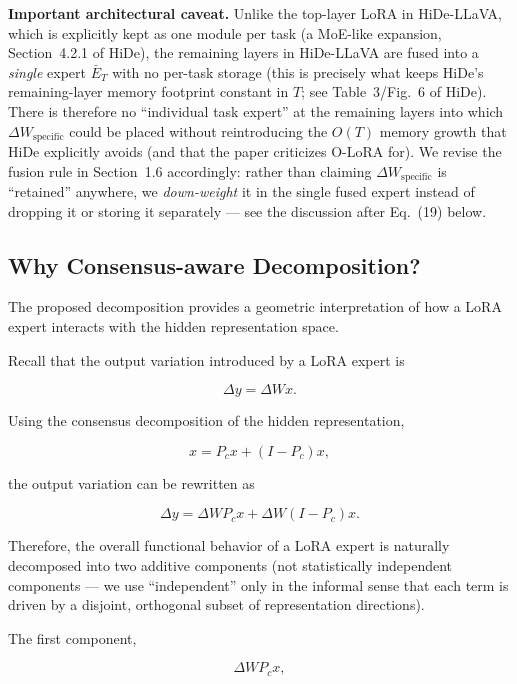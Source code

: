 \documentclass[a4paper]{article}
\begin{document}
\textbf{Important architectural caveat.} Unlike the top-layer LoRA in HiDe-LLaVA, which is explicitly kept as one module per task (a MoE-like expansion, Section~4.2.1 of HiDe), the remaining layers in HiDe-LLaVA are fused into a \emph{single} expert $\bar E_T$ with no per-task storage (this is precisely what keeps HiDe's remaining-layer memory footprint constant in $T$; see Table~3/Fig.~6 of HiDe). There is therefore no ``individual task expert'' at the remaining layers into which $\Delta W_{\mathrm{specific}}$ could be placed without reintroducing the $O(T)$ memory growth that HiDe explicitly avoids (and that the paper criticizes O-LoRA for). We revise the fusion rule in Section~1.6 accordingly: rather than claiming $\Delta W_{\mathrm{specific}}$ is ``retained'' anywhere, we \emph{down-weight} it in the single fused expert instead of dropping it or storing it separately — see the discussion after Eq.~(19) below.

\subsection{Why Consensus-aware Decomposition?}

The proposed decomposition provides a geometric interpretation of how a LoRA expert interacts with the hidden representation space.

Recall that the output variation introduced by a LoRA expert is

\begin{equation}
\Delta y
=
\Delta Wx.
\end{equation}

Using the consensus decomposition of the hidden representation,

\[
x=P_cx+(I-P_c)x,
\]

the output variation can be rewritten as

\begin{equation}
\Delta y
=
\Delta WP_cx
+
\Delta W(I-P_c)x.
\end{equation}

Therefore, the overall functional behavior of a LoRA expert is naturally decomposed into two additive components (not statistically independent components — we use ``independent'' only in the informal sense that each term is driven by a disjoint, orthogonal subset of representation directions).

The first component,

\[
\Delta WP_cx,
\]
\end{document}
